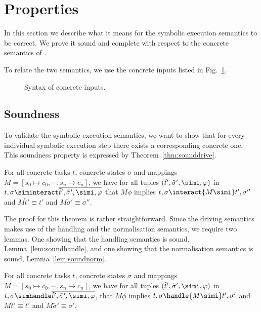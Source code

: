 


\section{Properties}
\label{sec:properties}

In this section we describe what it means for the symbolic execution semantics to be correct.
We prove it sound and complete with respect to the concrete semantics of \TOPHAT.

To relate the two semantics, we use the concrete inputs listed in Fig.~\ref{fig:inputsConcrete}.

\begin{figure}[h]
  \caption{Syntax of concrete inputs.}
  \label{fig:inputsConcrete}
\end{figure}


\subsection{Soundness}
\label{sec:soundess}


To validate the symbolic execution semantics,
we want to show that for every individual symbolic execution step there exists a corresponding concrete one.
This soundness property is expressed by Theorem~\ref{thm:sounddrive}.

\begin{theorem}
  \label{thm:sounddrive}

  For all concrete tasks $t$, concrete states $\sigma$ and mappings $M=[s_0\mapsto c_0,\cdots,s_n\mapsto c_n]$,
    we have for all tuples $(\tilde{t}',\tilde{\sigma}',\simi,\phi)$ in $t,\sigma\siminteract \overline{\tilde{t}',\tilde{\sigma}',\simi,\phi}$ that
    $M\phi$ implies
    $t,\sigma \interact{M \simi} t',\sigma''$ and $M\tilde{t}' \equiv t'$ and $M\tilde{\sigma}' \equiv \sigma''$.
\end{theorem}

The proof for this theorem is rather straightforward.
Since the driving semantics makes use of the handling and the normalisation semantics, we require two lemmas.
One showing that the handling semantics is sound, Lemma~\ref{lem:soundhandle}, and one showing that the normalisation semantics is sound, Lemma~\ref{lem:soundnorm}.

\begin{lemma}
  \label{lem:soundhandle}

  For all concrete tasks $t$, concrete states $\sigma$ and mappings $M = [s_0\mapsto c_0,\cdots,s_n\mapsto c_n]$,
    we have for all tuples $(\tilde{t}',\tilde{\sigma}',\simi,\phi)$ in
    $t,\sigma\simhandle \overline{\tilde{t}',\tilde{\sigma}',\simi,\phi}$,
    that $M\phi$ implies
    $t,\sigma \handle{M \simi} t',\sigma'$ and $M\tilde{t}' \equiv t' $ and $M\tilde{\sigma}' \equiv \sigma'$.
\end{lemma}

